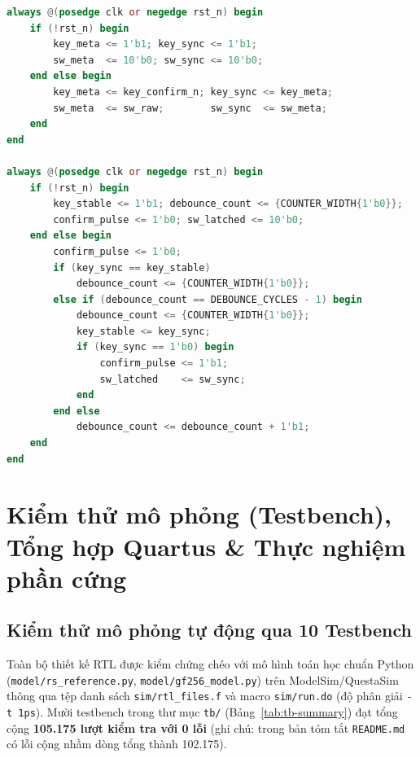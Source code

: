\begin{lstlisting}[language=Verilog]
always @(posedge clk or negedge rst_n) begin
    if (!rst_n) begin
        key_meta <= 1'b1; key_sync <= 1'b1;
        sw_meta  <= 10'b0; sw_sync <= 10'b0;
    end else begin
        key_meta <= key_confirm_n; key_sync <= key_meta;
        sw_meta  <= sw_raw;        sw_sync  <= sw_meta;
    end
end

always @(posedge clk or negedge rst_n) begin
    if (!rst_n) begin
        key_stable <= 1'b1; debounce_count <= {COUNTER_WIDTH{1'b0}};
        confirm_pulse <= 1'b0; sw_latched <= 10'b0;
    end else begin
        confirm_pulse <= 1'b0;
        if (key_sync == key_stable)
            debounce_count <= {COUNTER_WIDTH{1'b0}};
        else if (debounce_count == DEBOUNCE_CYCLES - 1) begin
            debounce_count <= {COUNTER_WIDTH{1'b0}};
            key_stable <= key_sync;
            if (key_sync == 1'b0) begin
                confirm_pulse <= 1'b1;
                sw_latched    <= sw_sync;
            end
        end else
            debounce_count <= debounce_count + 1'b1;
    end
end
\end{lstlisting}

\section{Kiểm thử mô phỏng (Testbench), Tổng hợp Quartus \& Thực nghiệm phần cứng}
\label{sec:verif-synth}

\subsection*{Kiểm thử mô phỏng tự động qua 10 Testbench}
Toàn bộ thiết kế RTL được kiểm chứng chéo với mô hình toán học chuẩn Python (\texttt{model/rs\_reference.py}, \texttt{model/gf256\_model.py}) trên ModelSim/QuestaSim thông qua tệp danh sách \texttt{sim/rtl\_files.f} và macro \texttt{sim/run.do} (độ phân giải \texttt{-t 1ps}). Mười testbench trong thư mục \texttt{tb/} (Bảng~\ref{tab:tb-summary}) đạt tổng cộng \textbf{105.175 lượt kiểm tra với 0 lỗi} (ghi chú: trong bản tóm tắt \texttt{README.md} có lỗi cộng nhầm dòng tổng thành 102.175).

